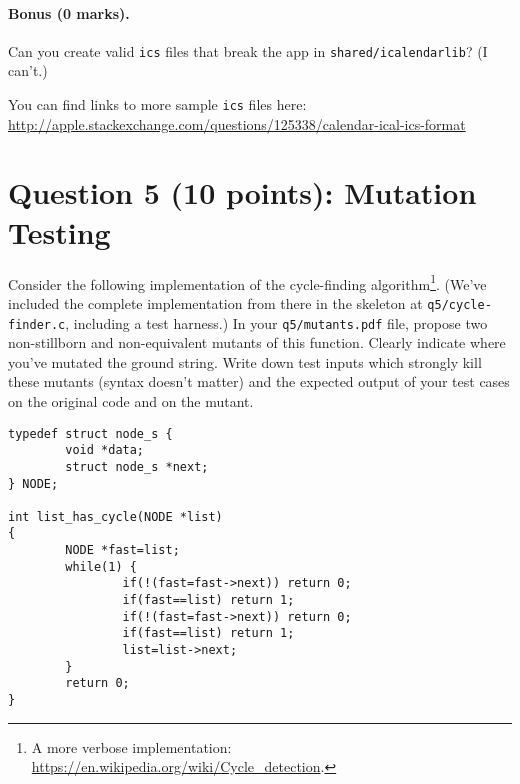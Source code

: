 \documentclass[10pt,hidelinks]{article}
\begin{document}
\paragraph{Bonus (0 marks).} Can you create valid {\tt ics} files that break the app in {\tt shared/icalendarlib}? (I can't.)

          
You can find links to more sample {\tt ics} files here:\\
\url{http://apple.stackexchange.com/questions/125338/calendar-ical-ics-format}

\section*{Question 5 (10 points): Mutation Testing} 

Consider the following implementation of the cycle-finding algorithm\footnote{A more verbose implementation: \url{https://en.wikipedia.org/wiki/Cycle_detection}.}. (We've included the complete implementation from there in the skeleton at {\tt q5/cycle-finder.c}, including a test harness.) In your {\tt q5/mutants.pdf} file, propose two non-stillborn and non-equivalent mutants of this function. Clearly indicate where you've mutated the ground string. Write down test inputs which strongly kill these mutants (syntax doesn't matter) and the expected output of your test cases on the original code and on the mutant.

\vspace*{-1em}
\begin{lstlisting}
typedef struct node_s {
        void *data;
        struct node_s *next;
} NODE;

int list_has_cycle(NODE *list)
{
        NODE *fast=list;
        while(1) {
                if(!(fast=fast->next)) return 0;
                if(fast==list) return 1;
                if(!(fast=fast->next)) return 0;
                if(fast==list) return 1;
                list=list->next;
        }
        return 0;
}
\end{lstlisting}
\end{document}
